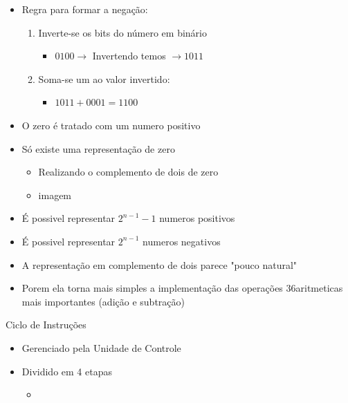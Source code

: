 \documentclass[12pt]{article}
\begin{document}
\begin{itemize}
\begin{itemize}
                \item Regra para formar a negação:
                \begin{enumerate}
                    \item Inverte-se os bits do número em binário
                    \begin{itemize}
                        \item $0100 \rightarrow$ Invertendo temos $\rightarrow
                        1011$
                    \end{itemize}
                    \item Soma-se um ao valor invertido:
                    \begin{itemize}
                        \item $1011 + 0001 = 1100$  
                    \end{itemize}
                \end{enumerate}
                \item O zero é tratado com um numero positivo
                \item Só existe uma representação de zero
                \begin{itemize}
                    \item Realizando o complemento de dois de zero
                    \item [] imagem
                \end{itemize}
                \item É possivel representar $2^{n-1}-1$ numeros positivos
                \item É possivel representar $2^{n-1}$ numeros negativos
                \item A representação em complemento de dois parece "pouco 
                natural"
                \item Porem ela torna mais simples a implementação das operações 
                36aritmeticas mais importantes (adição e subtração)
            \end{itemize}
        \end{itemize}
Ciclo de Instruções
\begin{itemize}
    \item Gerenciado pela Unidade de Controle
    \item Dividido em 4 etapas
    \begin{itemize}
        \item 
    \end{itemize}
\end{itemize}
\end{document}
